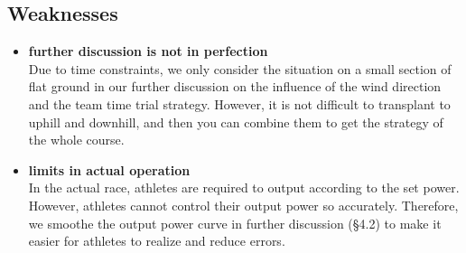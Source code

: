 \documentclass{mcmthesis}
\begin{document}
\subsection{Weaknesses}
\begin{itemize}
\item \textbf{further discussion is not in perfection}\\
Due to time constraints, we only consider the situation on a small section of flat ground in our further discussion on the influence of the wind direction and the team time trial strategy. However, it is not difficult to transplant to uphill and downhill, and then you can combine them to get the strategy of the whole course.
\item \textbf{limits in actual operation}\\
In the actual race, athletes are required to output according to the set power. However, athletes cannot control their output power so accurately. Therefore, we smoothe the output power curve in further discussion (§4.2) to make it easier for athletes to realize and reduce errors.
\end{itemize}


\newpage
\end{document}
